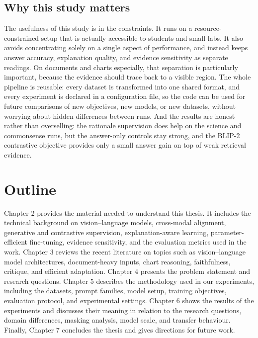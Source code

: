 \documentclass[12pt,bibliography=totoc,listof=totoc,BCOR=5mm,DIV=12,oneside,open=any]{scrbook}
\begin{document}
\subsection{Why this study matters}
The usefulness of this study is in the constraints.
It runs on a resource-constrained setup that is actually accessible to students and small labs.
It also avoids concentrating solely on a single aspect of performance, and instead keeps answer accuracy, explanation quality, and evidence sensitivity as separate readings.
On documents and charts especially, that separation is particularly important, because the evidence should trace back to a visible region.
The whole pipeline is reusable: every dataset is transformed into one shared format, and every experiment is declared in a configuration file,
so the code can be used for future comparisons of new objectives, new models, or new datasets, without worrying about hidden differences between runs.
And the results are honest rather than overselling: the rationale supervision does help on the science and commonsense runs, but the answer-only controls stay strong,
and the BLIP-2 contrastive objective provides only a small answer gain on top of weak retrieval evidence.

\section{Outline}
Chapter 2 provides the material needed to understand this thesis.
It includes the technical background on vision--language models, cross-modal alignment,
generative and contrastive supervision, explanation-aware learning,
parameter-efficient fine-tuning, evidence sensitivity, and the evaluation metrics used in the work.
Chapter 3 reviews the recent literature on topics such as vision--language model architectures,
document-heavy inputs, chart reasoning, faithfulness, critique, and efficient adaptation.
Chapter 4 presents the problem statement and research questions.
Chapter 5 describes the methodology used in our experiments,
including the datasets, prompt families, model setup, training objectives, evaluation protocol, and experimental settings.
Chapter 6 shows the results of the experiments and discusses their meaning in relation to the research questions, domain differences, masking analysis, model scale, and transfer behaviour.
Finally, Chapter 7 concludes the thesis and gives directions for future work.
\end{document}
